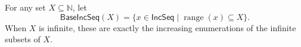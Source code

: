 \begin{definition}
For any set $X\subseteq\mathbb N$, let
\[
\mathsf{BaseIncSeq}(X)=\{x\in\mathsf{IncSeq}\mid \operatorname{range}(x)\subseteq X\}.
\]
When $X$ is infinite, these are exactly the increasing enumerations of the
infinite subsets of $X$.
\end{definition}
